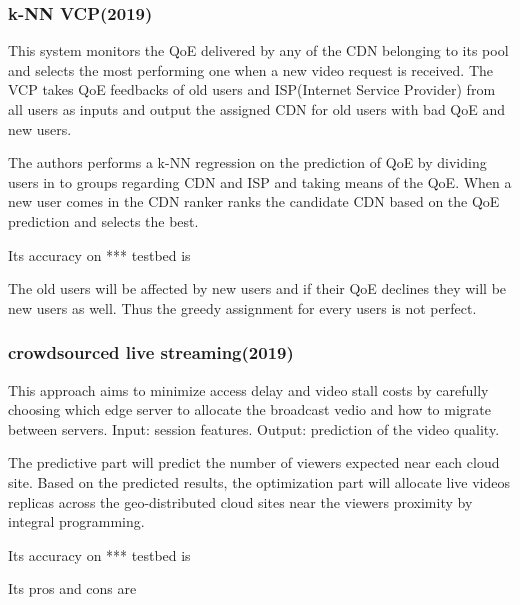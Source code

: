 \documentclass{ctexart}
\begin{document}
\subsubsection{k-NN VCP(2019)\cite{DBLP:journals/adhoc/CiccoMP19}}
\par This system monitors the QoE delivered by any of the CDN belonging to its pool and selects the most performing one when a new video request is received. The VCP takes QoE feedbacks of old users and ISP(Internet Service Provider) from all users as inputs and output the assigned CDN for old users with bad QoE and new users.
\par The authors performs a k-NN regression on the prediction of QoE by dividing users in to groups regarding CDN and ISP and taking means of the QoE. When a new user comes in the CDN ranker ranks the candidate CDN based on the QoE prediction and selects the best.
\par Its accuracy on *** testbed is 
\par The old users will be affected by new users and if their QoE declines they will be new users as well. Thus the greedy assignment for every users is not perfect.
\subsubsection{crowdsourced live streaming(2019)\cite{DBLP:conf/icc/HaouariBEMG19}}
\par This approach aims to minimize access delay and video stall costs by carefully choosing which edge server to allocate the broadcast vedio and how to migrate between servers.  Input: session features. Output: prediction of the video quality.
\par The predictive part will predict the number of viewers expected near each cloud site. Based on the predicted results, the optimization part will allocate live videos replicas across the geo-distributed cloud sites near the viewers proximity by integral programming.
\par Its accuracy on *** testbed is 
\par Its pros and cons are
\end{document}
